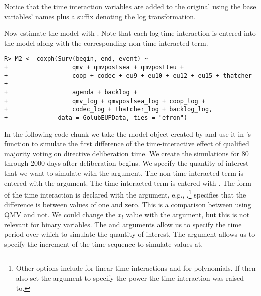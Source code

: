 \documentclass[nojss]{jss}\usepackage[]{graphicx}\usepackage[]{color}
\makeatletter
\newenvironment{kframe}{%
 \def\at@end@of@kframe{}%
 \ifinner\ifhmode%
  \def\at@end@of@kframe{\end{minipage}}%
  \begin{minipage}{\columnwidth}%
 \fi\fi%
 \def\FrameCommand##1{\hskip\@totalleftmargin \hskip-\fboxsep
 \colorbox{shadecolor}{##1}\hskip-\fboxsep
     \hskip-\linewidth \hskip-\@totalleftmargin \hskip\columnwidth}%
 \MakeFramed {\advance\hsize-\width
   \@totalleftmargin\z@ \linewidth\hsize
   \@setminipage}}%
 {\par\unskip\endMakeFramed%
 \at@end@of@kframe}
\newenvironment{knitrout}{}{} %
\makeatother
\begin{document}
Notice that the time interaction variables are added to the original  using the base variables' names plus a suffix denoting the log transformation.

Now estimate the model with . Note that each log-time interaction is entered into the model along with the corresponding non-time interacted term.

\begin{knitrout}
\color{fgcolor}\begin{kframe}
\begin{verbatim}
R> M2 <- coxph(Surv(begin, end, event) ~
+                  qmv + qmvpostsea + qmvpostteu +
+                  coop + codec + eu9 + eu10 + eu12 + eu15 + thatcher +
+                  agenda + backlog +
+                  qmv_log + qmvpostsea_log + coop_log +
+                  codec_log + thatcher_log + backlog_log,
+              data = GolubEUPData, ties = "efron")
\end{verbatim}
\end{kframe}
\end{knitrout}

In the following code chunk we take the  model object created by  and use it in 's  function to simulate the first difference of the time-interactive effect of qualified majority voting on directive deliberation time. We create the simulations for 80 through 2000 days after deliberation begins. We specify the quantity of interest that we want to simulate with the  argument. The non-time interacted term is entered with the  argument. The time interacted term is entered with . The form of the time interaction is declared with the  argument, e.g., .\footnote{Other options include  for linear time-interactions and  for polynomials. If  then also set the argument  to specify the power the time interaction was raised to.}  specifies that the difference is between values of  one and zero. This is a comparison between using QMV and not. We could change the $x_{l}$ value with the  argument, but this is not relevant for binary variables. The  and  arguments allow us to specify the time period over which to simulate the quantity of interest. The  argument allows us to specify the increment of the time sequence to simulate values at.
\end{document}
